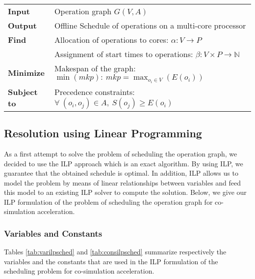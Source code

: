 \begin{table}[H]
\centering
\begin{tabular}{l  l}
  \rule{0pt}{5ex}	
	\textbf{Input} & Operation graph $G(V,A)$\\
	\rule{0pt}{5ex}									  
	
  \textbf{Output} & Offline Schedule of operations on a multi-core processor\\
	\rule{0pt}{5ex}									  
  
	\textbf{Find} & Allocation of operations to cores: $\alpha: V \rightarrow P$\\
                & Assignment of start times to operations: $\beta: V \times P \rightarrow \mathbb{N}$\\
	\rule{0pt}{5ex}
	
	\textbf{Minimize} & Makespan of the graph: $\min(mkp):\ mkp = \max_{o_i \in V}(E(o_i))$\\
	\rule{0pt}{5ex}									 
	
	\textbf{Subject to} & Precedence constraints: $\forall\ (o_i,o_j) \in A,\ S(o_j) \geq E(o_i)$\\
										 
\end{tabular}
\end{table}

\subsection{\label{subsec:ilpschedacc}Resolution using Linear Programming}

As a first attempt to solve the problem of scheduling the operation graph, we decided to use the ILP approach which is an exact algorithm. By using ILP, we guarantee that the obtained schedule is optimal. In addition, ILP allows us to model the problem by means of linear relationships between variables and feed this model to an existing ILP solver to compute the solution. Below, we give our ILP formulation of the problem of scheduling the operation graph for co-simulation acceleration.

\subsubsection{Variables and Constants}

Tables \ref{tab:varilpsched} and \ref{tab:consilpsched} summarize respectively the variables and the constants that are used in the ILP formulation of the scheduling problem for co-simulation acceleration.


